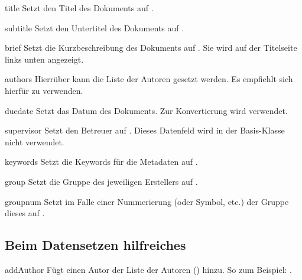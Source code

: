 \documentclass[useartcl,notoc]{sopra-paper}
\begin{document}
\begin{command}{title}{}
    Setzt den Titel des Dokuments auf .
\end{command}

\begin{command}{subtitle}{}
    Setzt den Untertitel des Dokuments auf .
\end{command}

\begin{command}{brief}{}
    Setzt die Kurzbeschreibung des Dokuments auf . Sie wird auf der Titelseite links unten angezeigt.
\end{command}

\begin{command}{authors}{}
    Hierrüber kann die Liste der Autoren gesetzt werden. Es empfiehlt sich
    hierfür  zu verwenden.
\end{command}

\begin{command}{duedate}{}
   Setzt das Datum des Dokuments. Zur Konvertierung wird 
   verwendet.
\end{command}

\begin{command}{supervisor}{}
    Setzt den Betreuer auf . Dieses Datenfeld wird in der Basis-Klasse nicht verwendet.
\end{command}

\begin{command}{keywords}{}
    Setzt die Keywords für die Metadaten auf .
\end{command}

\begin{command}{group}{}
    Setzt die Gruppe des jeweiligen Erstellers auf .%
\end{command}

\begin{command}{groupnum}{}
    Setzt im Falle einer Nummerierung (oder Symbol, etc.) der Gruppe dieses
    auf .
\end{command}

\subsection{Beim Datensetzen hilfreiches}
\begin{command}{addAuthor}{}
    Fügt einen Autor der Liste der Autoren () hinzu. So zum
    Beispiel: .
\end{command}
\end{document}

